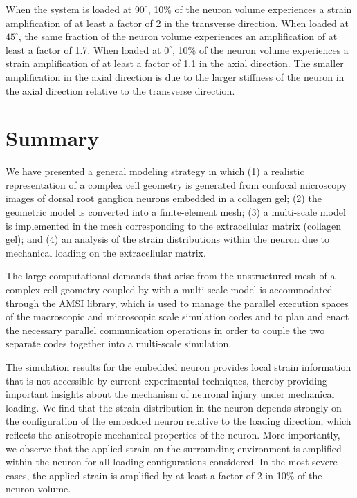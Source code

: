 \documentclass[]{interact}
\begin{document}
When the system is loaded at $90^{\circ}$, 10$\%$ of the neuron volume experiences a strain amplification of at least a factor of 2 in the transverse direction. When loaded at $45^{\circ}$, the same fraction of the neuron volume experiences an amplification of at least a factor of 1.7. When loaded at $0^{\circ}$, 10$\%$ of the neuron volume experiences a strain amplification of at least a factor of 1.1 in the axial direction. The smaller amplification in the axial direction is due to the larger stiffness of the neuron in the axial direction relative to the transverse direction. 

\section{Summary}
\label{sec:summary}

We have presented a general modeling strategy in which (1) a realistic representation of a complex cell geometry is generated from confocal microscopy images of dorsal root ganglion neurons embedded in a collagen gel; (2) the geometric model is converted into a finite-element mesh; (3) a multi-scale model is implemented in the mesh corresponding to the extracellular matrix (collagen gel); and (4) an analysis of the strain distributions within the neuron due to mechanical loading on the extracellular matrix.

The large computational demands that arise from the unstructured mesh of a complex cell geometry coupled by with a multi-scale model is accommodated through the AMSI library, which is used to manage the parallel execution spaces of the macroscopic and microscopic scale simulation codes and to plan and enact the necessary parallel communication operations in order to couple the two separate codes together into a multi-scale simulation.

The simulation results for the embedded neuron provides local strain information that is not accessible by current experimental techniques, thereby providing important insights about the mechanism of neuronal injury under mechanical loading. We find that the strain distribution in the neuron depends strongly on the configuration of the embedded neuron relative to the loading direction, which reflects the anisotropic mechanical properties of the neuron. More importantly, we observe that the applied strain on the surrounding environment is amplified within the neuron for all loading configurations considered. In the most severe cases, the applied strain is amplified by at least a factor of 2 in 10$\%$ of the neuron volume. 
\end{document}

